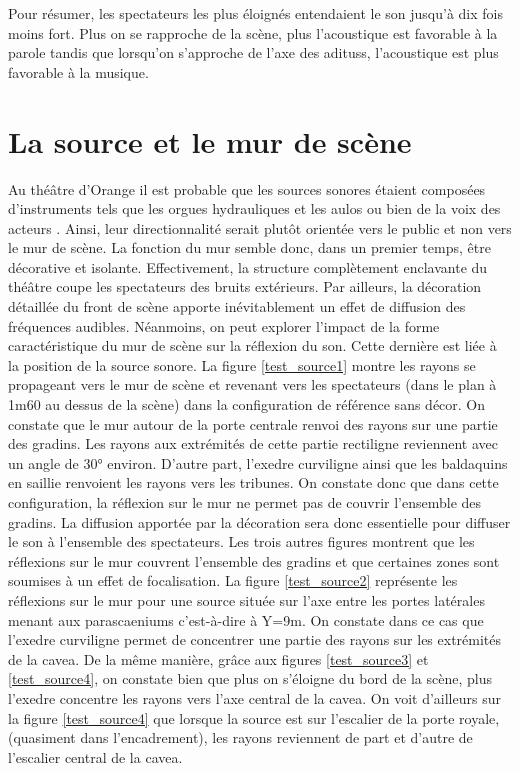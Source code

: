 Pour résumer, les spectateurs les plus éloignés entendaient le son jusqu'à dix fois moins fort. Plus on se rapproche de la scène, plus l'acoustique est favorable à la parole tandis que lorsqu'on s'approche de l'axe des \glspl{aditus}, l'acoustique est plus favorable à la musique.

\section{La source et le mur de scène}

Au théâtre d'Orange il est probable que les sources sonores étaient composées d'instruments tels que les orgues hydrauliques \cite[p.65]{rocconi} et les \gls{aulos} \cite[p.33]{rocconi} ou bien de la voix des acteurs \cite[]{voixRomain}. Ainsi, leur directionnalité serait plutôt orientée vers le public et non vers le mur de scène. La fonction du mur semble donc, dans un premier temps, être décorative et isolante. Effectivement, la structure complètement enclavante du théâtre coupe les spectateurs des bruits extérieurs. Par ailleurs, la décoration détaillée du front de scène apporte inévitablement un effet de diffusion des fréquences audibles. Néanmoins, on peut explorer l'impact de la forme caractéristique du mur de scène sur la réflexion du son. Cette dernière est liée à la position de la source sonore. La figure \ref{test_source1} montre les rayons se propageant vers le mur de scène et revenant vers les spectateurs (dans le plan à 1m60 au dessus de la scène) dans la configuration de référence sans décor. On constate que le mur autour de la porte centrale renvoi des rayons sur une partie des gradins. Les rayons aux extrémités de cette partie rectiligne reviennent avec un angle de 30° environ. D'autre part, l'\gls{exedre} curviligne ainsi que les baldaquins en saillie renvoient les rayons vers les tribunes. On constate donc que dans cette configuration, la réflexion sur le mur ne permet pas de couvrir l'ensemble des gradins. La diffusion apportée par la décoration sera donc essentielle pour diffuser le son à l'ensemble des spectateurs. Les trois autres figures montrent que les réflexions sur le mur couvrent l'ensemble des gradins et que certaines zones sont soumises à un effet de focalisation. La figure \ref{test_source2} représente les réflexions sur le mur pour une source située sur l'axe entre les portes latérales menant aux \glspl{parascaenium} c'est-à-dire à Y=9m. On constate dans ce cas que l'\gls{exedre} curviligne permet de concentrer une partie des rayons sur les extrémités de la \gls{cavea}. De la même manière, grâce aux figures \ref{test_source3} et \ref{test_source4}, on constate bien que plus on s'éloigne du bord de la scène, plus l'\gls{exedre} concentre les rayons vers l'axe central de la \gls{cavea}. On voit d'ailleurs sur la figure \ref{test_source4} que lorsque la source est sur l'escalier de la porte royale, (quasiment dans l'encadrement), les rayons reviennent de part et d'autre de l'escalier central de la \gls{cavea}. 

